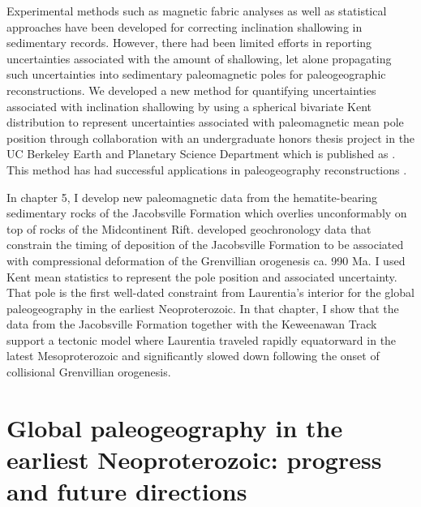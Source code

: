 Experimental methods such as magnetic fabric analyses \cite[e.g.][]{Kodama1995a, Bilardello2010a, Bilardello2010c, Bilardello2010b} as well as statistical approaches \cite[e.g.][]{Tauxe2004b} have been developed for correcting inclination shallowing in sedimentary records. However, there had been limited efforts in reporting uncertainties associated with the amount of shallowing, let alone propagating such uncertainties into sedimentary paleomagnetic poles for paleogeographic reconstructions. We developed a new method for quantifying uncertainties associated with inclination shallowing by using a spherical bivariate Kent distribution to represent uncertainties associated with paleomagnetic mean pole position through collaboration with an undergraduate honors thesis project in the UC Berkeley Earth and Planetary Science Department which is published as \cite{Pierce2022a}. This method has had successful applications in paleogeography reconstructions \citep{Slotznick2023a, Vaes2023a, Zhang2024a}. 

In chapter 5, I develop new paleomagnetic data from the hematite-bearing sedimentary rocks of the Jacobsville Formation which overlies unconformably on top of rocks of the Midcontinent Rift. \cite{Hodgin2022a} developed geochronology data that constrain the timing of deposition of the Jacobsville Formation to be associated with compressional deformation of the Grenvillian orogenesis ca. 990 Ma. I used Kent mean statistics to represent the pole position and associated uncertainty. That pole is the first well-dated constraint from Laurentia's interior for the global paleogeography in the earliest Neoproterozoic. In that chapter, I show that the data from the Jacobsville Formation together with the Keweenawan Track support a tectonic model where Laurentia traveled rapidly equatorward in the latest Mesoproterozoic and significantly slowed down following the onset of collisional Grenvillian orogenesis. 

\section{Global paleogeography in the earliest Neoproterozoic: progress and future directions}

